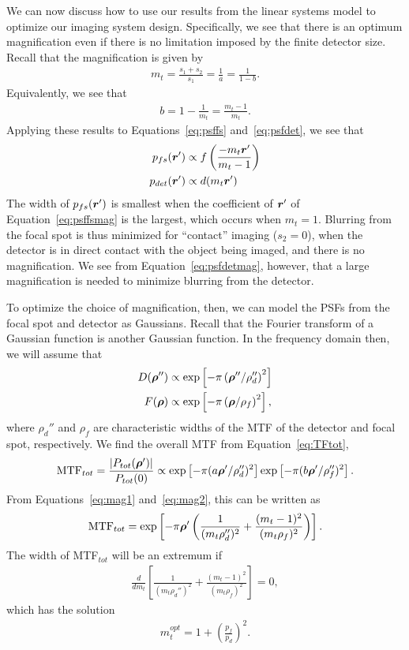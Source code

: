 \documentclass[mphy386-notes.tex]{subfiles}
\begin{document}
We can now discuss how to use our results from the linear systems
model to optimize our imaging system design. Specifically, we see
that there is an optimum magnification even if there is no limitation
imposed by the finite detector size. Recall that the magnification is
given by
\begin{align}
  m_t = \frac{s_1+s_2}{s_1} = \frac{1}{a} = \frac{1}{1-b}.
  \label{eq:mag1}
\end{align}
Equivalently, we see that
\begin{align}
  b = 1 - \frac{1}{m_t} = \frac{m_t - 1}{m_t}.
  \label{eq:mag2}
\end{align}
Applying these results to Equations~\ref{eq:psffs} and~\ref{eq:psfdet},
we see that
\begin{align}
  p_{fs}(\boldsymbol{r}') &\propto f\left(\frac{-m_t\boldsymbol{r}'}{m_t - 1}\right)\label{eq:psffsmag}\\
  p_{det}(\boldsymbol{r}') &\propto d(m_t\boldsymbol{r}')\label{eq:psfdetmag}
\end{align}
The width of $p_{fs}(\boldsymbol{r}')$ is smallest when the coefficient of $\boldsymbol{r}'$ of
Equation~\ref{eq:psffsmag} is the largest, which occurs when $m_t = 1$. Blurring
from the focal spot is thus minimized for ``contact'' imaging ($s_2 = 0$), when
the detector is in direct contact with the object being imaged, and there is no
magnification. We see from Equation~\ref{eq:psfdetmag}, however, that a large
magnification is needed to minimize blurring from the detector.

To optimize the choice of magnification, then, we can model the PSFs from the
focal spot and detector as Gaussians. Recall that the Fourier transform of a
Gaussian function is another Gaussian function. In the frequency domain then, we
will assume that
\begin{align}
  D(\boldsymbol{\rho}'') &\propto \text{exp}\left[-\pi\left(\boldsymbol{\rho}''/\rho_d''\right)^2\right]\\
  F(\boldsymbol{\rho}) &\propto \text{exp}\left[-\pi\left(\boldsymbol{\rho}/\rho_f\right)^2\right],
\end{align}
where $\rho_d''$ and $\rho_f$ are characteristic widths of the MTF of the detector and
focal spot, respectively. We find the overall MTF from Equation~\ref{eq:TFtot},
\begin{align}
  \text{MTF}_{tot} = \frac{|P_{tot}(\boldsymbol{\rho}')|}{P_{tot}(0)} \propto \text{exp}\left[-\pi(a\boldsymbol{\rho}'/\rho_d'')^2\right]\text{exp}\left[-\pi(b\boldsymbol{\rho}'/\rho_f'')^2\right].
\end{align}
From Equations~\ref{eq:mag1} and~\ref{eq:mag2}, this can be written as
\begin{align}
  \text{MTF}_{tot} = \text{exp}\left[-\pi\boldsymbol{\rho}'\left(\frac{1}{(m_t \rho_d'')^2} + \frac{(m_t-1)^2}{(m_t\rho_f)^2}\right)\right].
\end{align}
The width of MTF$_{tot}$ will be an extremum if
\begin{align}
  \frac{d}{d m_t}\left[\frac{1}{(m_t \rho_d'')^2} + \frac{(m_t-1)^2}{(m_t\rho_f)^2}\right] = 0,
\end{align}
which has the solution
\begin{align}
  m_t^{opt} = 1 + \left(\frac{p_f}{p_d}\right)^2.
  \label{eq:magopt}
\end{align}
\end{document}
